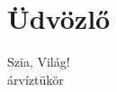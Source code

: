 \documentclass{article}
\begin{document}
 \section{Üdvözlő}
 Szia, Világ!\\
 \MakeLowercase{ÁRVÍZTÜKÖR}
 
\end{document}
